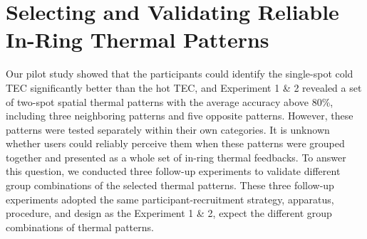 \documentclass[preprint,12pt]{elsarticle}
\begin{document}

\section{Selecting and Validating Reliable In-Ring Thermal Patterns}
Our pilot study showed that the participants could identify the single-spot cold TEC significantly better than the hot TEC, and Experiment 1 \& 2 revealed a set of two-spot spatial thermal patterns with the average accuracy above 80\%, including three neighboring patterns and five opposite patterns. However, these patterns were tested separately within their own categories. It is unknown whether users could reliably perceive them when these patterns were grouped together and presented as a whole set of in-ring thermal feedbacks. To answer this question, we conducted three follow-up experiments to validate different group combinations of the selected thermal patterns. These three follow-up experiments adopted the same participant-recruitment strategy, apparatus, procedure, and design as the Experiment 1 \& 2, expect the different group combinations of thermal patterns.

\end{document}
